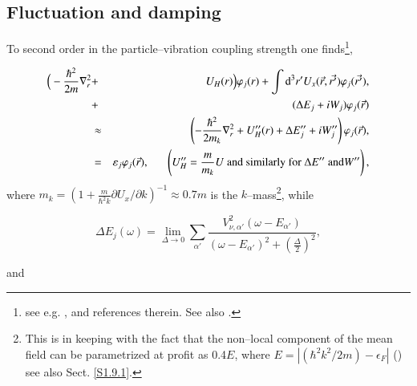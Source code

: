 \subsection{Fluctuation and damping}
 To second order in the particle--vibration coupling strength one finds\footnote{see e.g. \cite{Brink:05}, \cite{Mahaux:85} and references therein. See also \cite{Bernard:81}.},

\begin{eqnarray}\label{eqn:36}
\nonumber
\Big( -\frac{\hbar^2}{2m} \nabla_r^2 &+& U_H(r)\Big) \varphi_{j}(r) + \int {\rm d}^3 r' U_x(\vec{r},\vec{r'})\varphi_j(\vec{r'}), \\
\nonumber
&+& (\Delta E_j +iW_j)\varphi_j(\vec{r}) \\
&\approx& \left( -\frac{\hbar^2}{2m_k} \nabla_r^2 + U_H''(r) + \Delta E''_j + iW''_j \right) \varphi_j(\vec{r}), \\
\nonumber
&=& \varepsilon_j\varphi_j(\vec{r}), \;\;\;\;\;\; \left( U_H'' = \frac{m}{m_k} U\text{ and similarly for }\Delta E''\text{ and} W'' \right), 
\end{eqnarray}
 where  $m_k=\left(1+\frac{m}{\hbar^2 k}\partial U_x/\partial k\right)^{-1}\approx 0.7m$ is the $k$--mass\footnote{This is in keeping with the fact that the non--local component of the mean field can be parametrized at profit as 0.4$E$, where $E=|(\hbar^2k^2/2m)-\epsilon_F|$ (\cite{Perey:62}) see also Sect. \ref{S1.9.1}.}, while

\begin{equation}\label{eqn:37a}
\Delta E_j(\omega)  = \lim_{\Delta \rightarrow 0} \sum_{\alpha'} \frac{V^2_{\nu ,\alpha'} (\omega-E_{\alpha'})}{(\omega -E_{\alpha'})^2 + (\frac{\Delta}{2})^2},
\end{equation}

\noindent and

